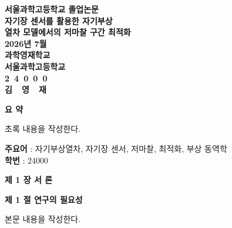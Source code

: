 \documentclass[11pt]{article}
\begin{document}
\thispagestyle{empty}
\vspace*{2cm}

\begin{center}
  {\LARGE \bf 서울과학고등학교 졸업논문}\\[30pt]
  {\Huge \bf 자기장 센서를 활용한 자기부상\\[12pt] 열차 모델에서의 저마찰 구간 최적화}\\[4cm]
  {\huge \bf 2026년 7월}\\[2cm]
  {\LARGE \bf 과학영재학교}\\[12pt]
  {\huge \bf 서울과학고등학교}\\[1cm]
  {\huge \bf 2~4~0~0~0}\\[12pt]
  {\huge \bf 김~~영~~재}
\end{center}

\newpage

\setcounter{page}{1}

\begin{center}
  {\LARGE \bf 요 약}\\[12pt]
\end{center}

\begin{flushleft}
초록 내용을 작성한다.
\end{flushleft}

\vspace{2.5cm}

\begin{flushleft}
\textbf{주요어} : 자기부상열차, 자기장 센서, 저마찰, 최적화, 부상 동역학\\
\textbf{학번} : 24000
\end{flushleft}

\newpage

\begin{center}
  {\LARGE \bf 제 1 장 서 론}\\[12pt]
\end{center}

\begin{flushleft}  
{\Large \bf 제 1 절 연구의 필요성}\\[12pt]
\end{flushleft} 

\begin{flushleft}
본문 내용을 작성한다.
\end{flushleft}

\newpage
\end{document}
